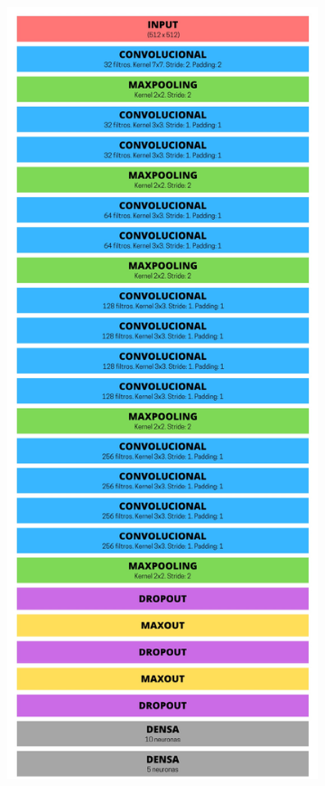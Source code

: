\begin{figure}[!t]
\begin{subfigure}[t]{0.25\textwidth}
  \includegraphics[width=\textwidth]{img/estructura_ghosh.png}

\end{subfigure}
\end{figure}
